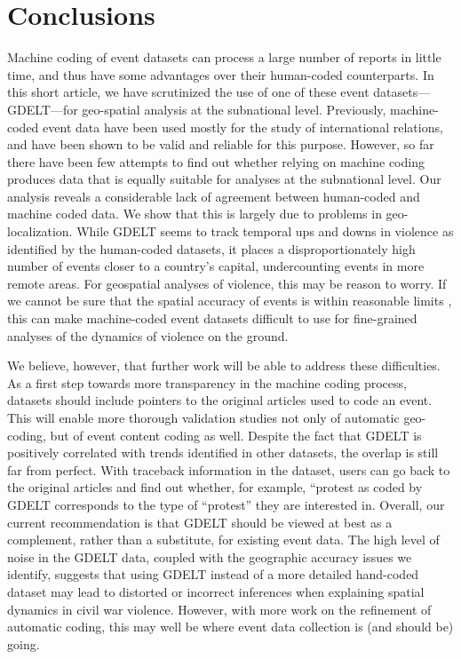 \documentclass[hidelinks]{article}
\begin{document}
\section*{Conclusions}

Machine coding of event datasets can process a large number of reports in little time, and thus have some advantages over their human-coded counterparts. In this short article, we have scrutinized the use of one of these event datasets---GDELT---for geo-spatial analysis at the subnational level. Previously, machine-coded event data have been used mostly for the study of international relations, and have been shown to be valid and reliable for this purpose. However, so far there have been few attempts to find out whether relying on machine coding produces data that is equally suitable for analyses at the subnational level. Our analysis reveals a considerable lack of agreement between human-coded and machine coded data. We show that this is largely due to problems in geo-localization. While GDELT seems to track temporal ups and downs in violence as identified by the human-coded datasets, it places a disproportionately high number of events closer to a country's capital, undercounting events in more remote areas. For geospatial analyses of violence, this may be reason to worry. If we cannot be sure that the spatial accuracy of events is within reasonable limits \citep{weidmann15accuracy}, this can make machine-coded event datasets difficult to use for fine-grained analyses of the dynamics of violence on the ground. 

We believe, however, that further work will be able to address these difficulties. As a first step towards more transparency in the machine coding process, datasets should include pointers to the original articles used to code an event. This will enable more thorough validation studies not only of automatic geo-coding, but of event content coding as well. Despite the fact that GDELT is positively correlated with trends identified in other datasets, the overlap is still far from perfect. With traceback information in the dataset, users can go back to the original articles and find out whether, for example, ``protest as coded by GDELT corresponds to the type of ``protest'' they are interested in. Overall, our current recommendation is that GDELT should be viewed at best as a complement, rather than a substitute, for existing event data. The high level of noise in the GDELT data, coupled with the geographic accuracy issues we identify, suggests that using GDELT instead of a more detailed hand-coded dataset may lead to distorted or incorrect inferences when explaining spatial dynamics in civil war violence. However, with more work on the refinement of automatic coding, this may well be where event data collection is (and should be) going.

\printbibliography
%
%
\end{document}
